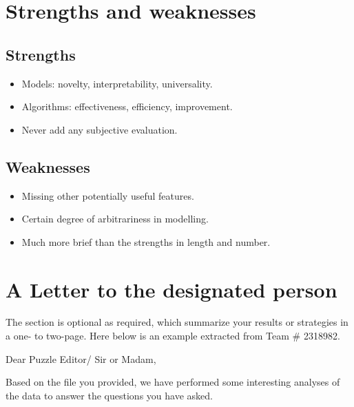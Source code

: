 \documentclass[12pt]{article}  %
\begin{document}
 \section{Strengths and weaknesses}
 
 \subsection{Strengths}
 
 \begin{itemize}
     \setlength{\parsep}{0ex} %
     \setlength{\topsep}{2ex} %
     \setlength{\itemsep}{1ex} %
     \item Models: novelty, interpretability,  universality.
     \item Algorithms: effectiveness, efficiency, improvement.	
     \item Never add any subjective evaluation.
 \end{itemize}
 
 \subsection{Weaknesses}
 
 \begin{itemize}
     \setlength{\parsep}{0ex} %
     \setlength{\topsep}{2ex} %
     \setlength{\itemsep}{1ex} %
     \item Missing other potentially useful features. 
     \item Certain degree of arbitrariness in modelling.	
     \item Much more brief than the strengths in length and number.
 \end{itemize}
 
 
 
 \clearpage
 \section{A Letter to the designated person}
 
 The section is optional as required, which summarize your results or strategies in a one- to two-page. Here below is an example extracted from Team \# 2318982.
 
 \noindent Dear Puzzle Editor/ Sir or Madam, 
 
 \noindent Based on the file you provided, we have performed some interesting analyses of the data to answer the questions you have asked.
 
\end{document}
